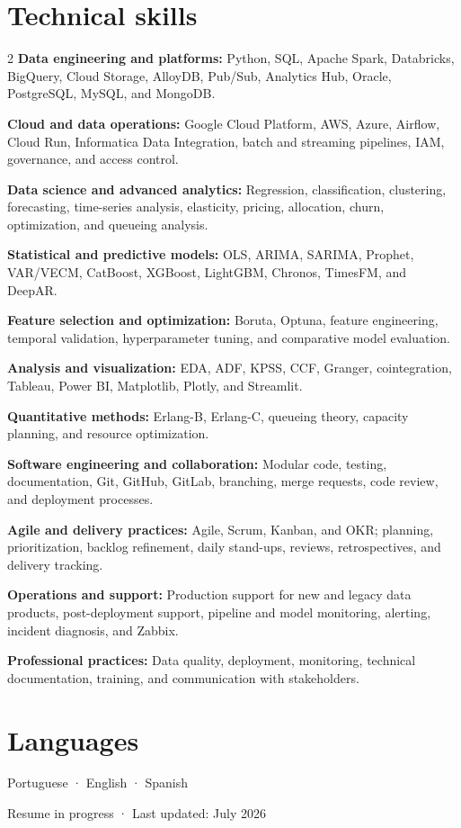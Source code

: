 \documentclass[10pt,a4paper]{article}
\newcommand{\skill}[2]{\textbf{#1:} #2\par}
\begin{document}
\section{Technical skills}

\begin{multicols}{2}
\raggedcolumns
\skill{Data engineering and platforms}{Python, SQL, Apache Spark, Databricks, BigQuery, Cloud Storage, AlloyDB, Pub/Sub, Analytics Hub, Oracle, PostgreSQL, MySQL, and MongoDB.}
\skill{Cloud and data operations}{Google Cloud Platform, AWS, Azure, Airflow, Cloud Run, Informatica Data Integration, batch and streaming pipelines, IAM, governance, and access control.}
\skill{Data science and advanced analytics}{Regression, classification, clustering, forecasting, time-series analysis, elasticity, pricing, allocation, churn, optimization, and queueing analysis.}
\skill{Statistical and predictive models}{OLS, ARIMA, SARIMA, Prophet, VAR/VECM, CatBoost, XGBoost, LightGBM, Chronos, TimesFM, and DeepAR.}
\skill{Feature selection and optimization}{Boruta, Optuna, feature engineering, temporal validation, hyperparameter tuning, and comparative model evaluation.}
\skill{Analysis and visualization}{EDA, ADF, KPSS, CCF, Granger, cointegration, Tableau, Power BI, Matplotlib, Plotly, and Streamlit.}
\skill{Quantitative methods}{Erlang-B, Erlang-C, queueing theory, capacity planning, and resource optimization.}
\skill{Software engineering and collaboration}{Modular code, testing, documentation, Git, GitHub, GitLab, branching, merge requests, code review, and deployment processes.}
\skill{Agile and delivery practices}{Agile, Scrum, Kanban, and OKR; planning, prioritization, backlog refinement, daily stand-ups, reviews, retrospectives, and delivery tracking.}
\skill{Operations and support}{Production support for new and legacy data products, post-deployment support, pipeline and model monitoring, alerting, incident diagnosis, and Zabbix.}
\skill{Professional practices}{Data quality, deployment, monitoring, technical documentation, training, and communication with stakeholders.}
\end{multicols}

\section{Languages}

Portuguese · English · Spanish

\vfill
{\footnotesize\color{grey} Resume in progress · Last updated: July 2026}
\end{document}
